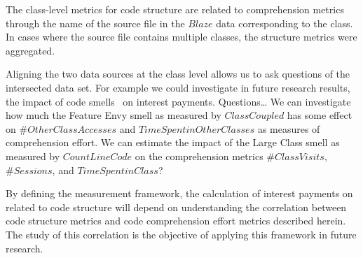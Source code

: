 The class-level metrics for code structure are related to comprehension metrics through the name of the source file in the $Blaze$ data corresponding to the class.  In cases where the source file contains multiple classes, the structure metrics were aggregated.

Aligning the two data sources at the class level allows us to ask questions of the intersected data set. For example we could investigate in future research results, the impact of code smells~\cite{Fowler_etal:1999} on interest payments. Questions\ldots{}
We can investigate how much the Feature Envy smell as measured by $Class Coupled$ has some effect on $\# Other Class Accesses$ and $Time Spent in Other Classes$ as measures of comprehension effort.  
We can estimate the impact of the Large Class smell as measured by $Count Line Code$ on the comprehension metrics $\# Class Visits$, $\# Sessions$, and $Time Spent in Class$?


By defining the measurement framework, the calculation of interest payments on \TD related to code structure will depend on understanding the correlation between code structure metrics and code comprehension effort metrics described herein.  The study of this correlation is the objective of applying this framework in future research.



